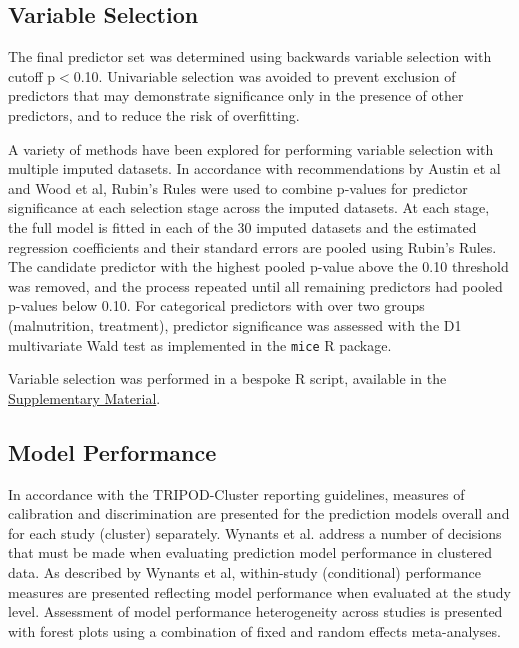 \subsection{\label{sec:meth-vs}Variable Selection}

The final predictor set was determined using backwards variable selection with cutoff p$<$0.10. Univariable selection was avoided to prevent exclusion of predictors that may demonstrate significance only in the presence of other predictors, and to reduce the risk of overfitting\cite{moons2019}.

A variety of methods have been explored for performing variable selection with multiple imputed datasets\cite{austin2019,wood2008}. In accordance with recommendations by Austin et al and Wood et al, Rubin's Rules were used to combine p-values for predictor significance at each selection stage across the imputed datasets. At each stage, the full model is fitted in each of the 30 imputed datasets and the estimated regression coefficients and their standard errors are pooled using Rubin's Rules. The candidate predictor with the highest pooled p-value above the 0.10 threshold was removed, and the process repeated until all remaining predictors had pooled p-values below 0.10\cite{austin2019,wood2008,rubin1987}. For categorical predictors with over two groups (malnutrition, treatment), predictor significance was assessed with the D1 multivariate Wald test as implemented in the \texttt{mice} R package\cite{van-buuren2011,li1991}. 

Variable selection was performed in a bespoke R script, available in the \href{https://github.com/jpwil/dphil}{Supplementary Material}.

\subsection{\label{sec:meth-perf}Model Performance}

In accordance with the TRIPOD-Cluster reporting guidelines, measures of calibration and discrimination are presented for the prediction models overall and for each study (cluster) separately\cite{debray2023}. Wynants et al. address a number of decisions that must be made when evaluating prediction model performance in clustered data\cite{wynants2018}. As described by Wynants et al, within-study (conditional) performance measures are presented reflecting model performance when evaluated at the study level\cite{wynants2018,van-klaveren2014}. Assessment of model performance heterogeneity across studies is presented with forest plots using a combination of fixed and random effects meta-analyses\cite{debray2017,van-klaveren2014}.

